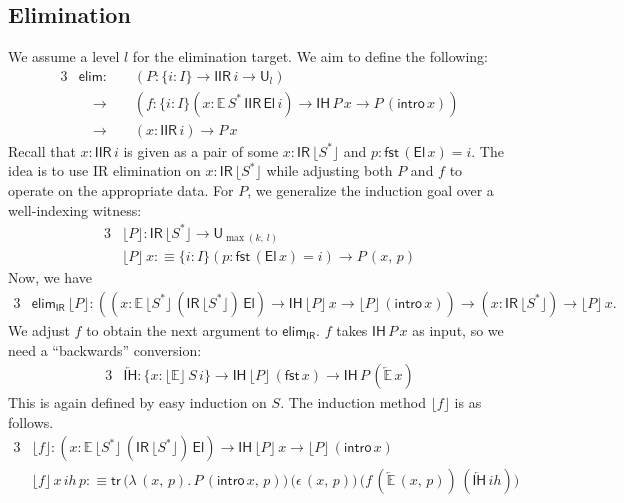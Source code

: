 \documentclass[acmsmall,screen,review,anonymous]{acmart}
\newcommand{\msf}[1]{{\mathsf{#1}}}
\newcommand{\mbb}[1]{\mathbb{#1}}
\newcommand{\U}{\msf{U}}
\newcommand{\El}{\msf{El}}
\newcommand{\IR}{\msf{IR}}
\newcommand{\ih}{{ih}}
\newcommand{\intro}{\msf{intro}}
\newcommand{\IH}{\msf{IH}}
\newcommand{\elim}{\msf{elim}}
\newcommand{\tr}{\msf{tr}}
\newcommand{\fst}{\msf{fst}}
\newcommand{\IIR}{\msf{IIR}}
\newcommand{\floord}[1]{\lfloor #1 \rfloor}
\newcommand{\ola}[1]{\overleftarrow{#1}}
\newcommand{\E}{\mbb{E}}
\begin{document}
\subsection{Elimination}\label{sec:iir-construction-elimination}

We assume a level $l$ for the elimination target. We aim to define the following:
\begin{alignat*}{3}
  &\elim :\,           &&(P : \{i : I\}\to \IIR\,i \to \U_l)\\
  &                \quad\to && (f : \{i : I\}(x : \E\,S^*\,\IIR\,\El\,i) \to \IH\,P\,x \to P\,(\intro\,x))\\
  &                \quad\to && (x : \IIR\,i) \to P\,x
\end{alignat*}
Recall that $x : \IIR\,i$ is given as a pair of some $x : \IR\,\floord{S^*}$ and $p :
\fst\,(\El\,x) = i$.  The idea is to use IR elimination on $x : \IR\,\floord{S^*}$ while adjusting
both $P$ and $f$ to operate on the appropriate data. For $P$, we generalize the induction goal
over a well-indexing witness:
\begin{alignat*}{3}
  &\floord{P} : \IR\,\floord{S^*} \to \U_{\max(k,\,l)} \\
  &\floord{P}\,x :\equiv \{i : I\}(p : \fst\,(\El\,x) = i) \to P\,(x,\,p)
\end{alignat*}
Now, we have
\begin{alignat*}{3}
  & \elim_\IR\,\floord{P} : ((x : \E\,\floord{S^*}\,(\IR\,\floord{S^*})\,\El) \to \IH\,\floord{P}\,x \to \floord{P}\,(\intro\,x))
       \to (x : \IR\,\floord{S^*}) \to \floord{P}\,x.
\end{alignat*}
We adjust $f$ to obtain the next argument to $\elim_\IR$. $f$ takes $\IH\,P\,x$ as input,
so we need a ``backwards'' conversion:
\begin{alignat*}{3}
  & \ola{\IH} : \{x : \floord{\E}\,S\,i\} \to \IH\,\floord{P}\,(\fst\,x) \to \IH\,P\,(\ola{\E}\,x)
\end{alignat*}
This is again defined by easy induction on $S$. The induction method $\floord{f}$ is as follows.
\begin{alignat*}{3}
  &\floord{f} : (x : \E\,\floord{S^*}\,(\IR\,\floord{S^*})\,\El) \to \IH\,\floord{P}\,x \to \floord{P}\,(\intro\,x)\\
  &\floord{f}\,x\,\ih\,p :\equiv \tr\,\bigl(\lambda\,(x,\,p).\,P\,(\intro\,x,\,p)\bigr)\,\bigl(\epsilon\,(x,\,p)\bigr)\,
                                      \bigl(f\,(\ola{\E}\,(x,\,p))\,(\ola{\IH}\,\ih)\bigr)
\end{alignat*}
\end{document}
